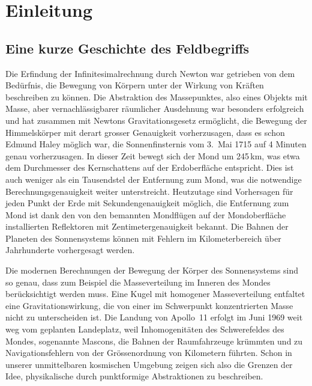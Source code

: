 %
%
%
\chapter{Einleitung
\label{buch:chapter:einleitung}}

\section{Eine kurze Geschichte des Feldbegriffs}
Die Erfindung der Infinitesimalrechnung durch Newton war getrieben
von dem Bedürfnis, die Bewegung von Körpern unter der Wirkung von
Kräften beschreiben zu können.
Die Abstraktion des Massepunktes, also eines Objekts mit Masse,
aber vernachlässigbarer räumlicher Ausdehnung war besonders erfolgreich
und hat zusammen mit Newtons Gravitationsgesetz ermöglicht, die
Bewegung der Himmelskörper mit derart grosser Genauigkeit vorherzusagen,
dass es schon Edmund Haley möglich war, die Sonnenfinsternis vom
3.~Mai 1715 auf 4 Minuten genau vorherzusagen.
In dieser Zeit bewegt sich der Mond um 245\,km, was etwa dem Durchmesser
des Kernschattens auf der Erdoberfläche entspricht.
Dies ist auch weniger als ein Tausendstel der Entfernung zum Mond,
was die notwendige Berechnungsgenauigkeit weiter unterstreicht.
Heutzutage sind Vorhersagen für jeden Punkt der Erde mit
Sekundengenauigkeit möglich, die Entfernung zum Mond ist dank den
von den bemannten Mondflügen auf der Mondoberfläche installierten
Reflektoren mit Zentimetergenauigkeit bekannt.
Die Bahnen der Planeten des Sonnensystems können mit Fehlern im
Kilometerbereich über Jahrhunderte vorhergesagt werden.

Die modernen Berechnungen der Bewegung der Körper des Sonnensystems
sind so genau, dass zum Beispiel die Masseverteilung im Inneren des
Mondes berücksichtigt werden muss.
Eine Kugel mit homogener Masseverteilung entfaltet eine
Gravitationswirkung, die von einer im Schwerpunkt konzentrierten
Masse nicht zu unterscheiden ist.
Die Landung von Apollo~11 erfolgt im Juni 1969 weit weg vom geplanten
Landeplatz, weil Inhomogenitäten des Schwerefeldes des Mondes,
sogenannte Mascons, die Bahnen der Raumfahrzeuge krümmten und zu
Navigationsfehlern von der Grössenordnung von Kilometern führten.
Schon in unserer unmittelbaren kosmischen Umgebung zeigen sich also die
Grenzen der Idee, physikalische durch punktformige Abstraktionen zu
beschreiben.

